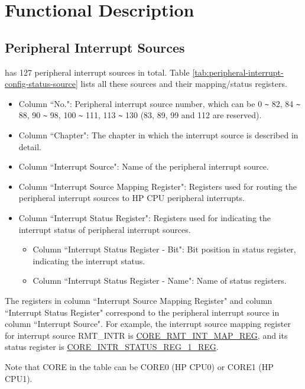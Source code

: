 \documentclass[main\_\_EN.tex]{subfiles}
\begin{document}
\section{Functional Description}

\subsection{Peripheral Interrupt Sources}

\chipname{} has 127 peripheral interrupt sources in total. Table \ref{tab:peripheral-interrupt-config-status-source} lists all these sources and their mapping/status registers.


\begin{itemize}
    \item Column ``No.": Peripheral interrupt source number, which can be 0 \verb+~+ 82, 84 \verb+~+ 88, 90 \verb+~+ 98, 100 \verb+~+ 111, 113 \verb+~+ 130 (83, 89, 99 and 112 are reserved).
    \item Column ``Chapter": The chapter in which the interrupt source is described in detail.
    \item Column ``Interrupt Source": Name of the peripheral interrupt source.
    \item Column ``Interrupt Source Mapping Register": Registers used for routing the peripheral interrupt sources to HP CPU peripheral interrupts.
    \item Column ``Interrupt Status Register": Registers used for indicating the interrupt status of peripheral interrupt sources.
    \begin{itemize}
        \item Column ``Interrupt Status Register - Bit": Bit position in status register, indicating the interrupt status.
        \item Column ``Interrupt Status Register - Name": Name of status registers.
    \end{itemize}
\end{itemize}

The registers in column ``Interrupt Source Mapping Register" and column ``Interrupt Status Register" correspond to the peripheral interrupt source in column ``Interrupt Source". For example, the interrupt source mapping register for interrupt source RMT\_INTR is \hyperref[regdesc:CORE0RMTINTMAPREG]{CORE\_RMT\_INT\_MAP\_REG}, and its status register is \hyperref[regdesc:CORE0INTRSTATUSREG1REG]{CORE\_INTR\_STATUS\_REG\_1\_REG}.

Note that CORE in the table can be CORE0 (HP CPU0) or CORE1 (HP CPU1).
\end{document}
